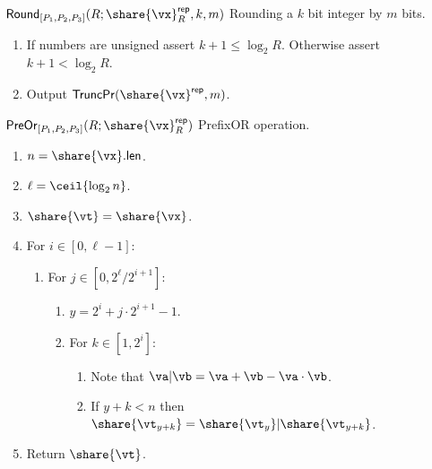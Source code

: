\msubsubsection
  {$\mathsf{Round}_{[P_1, P_2, P_3]}(R; \share{\vx}^\mathsf{rep}_R, k, m)$}
  Rounding a $k$ bit integer by $m$ bits.
  \begin{enumerate}
  \item If numbers are unsigned assert $k + 1 \leq \log_2{R}$. Otherwise assert $k+1 < \log_2{R}$.
  \item Output $\mathsf{TruncPr}(\share{\vx}^\mathsf{rep}, m)$.
\end{enumerate}

\msubsubsection
  {$\mathsf{PreOr}_{[P_1, P_2, P_3]}(R; \share{\vx}^\mathsf{rep}_R)$}
  PrefixOR operation.
  \begin{enumerate}
    \item $n = \share{\vx}.\mathsf{len}$.
    \item $\ell = \ceil{\log_2{n}}$.
    \item $\share{\vt} = \share{\vx}$.
    \item For $i \in [0, \ell-1]$:
    \begin{enumerate}
      \item For $j \in [0, 2^\ell/2^{i+1}]$:
      \begin{enumerate}
        \item $y = 2^i + j \cdot 2^{i+1} - 1$.
        \item For $k \in [1, 2^i]$:
        \begin{enumerate}
            \item Note that $\va | \vb = \va + \vb - \va \cdot \vb$.
            \item If $y + k < n$ then $\share{\vt_{y+k}} = \share{\vt_y} | \share{\vt_{y + k}}$.
        \end{enumerate}
      \end{enumerate}
    \end{enumerate}
    \item Return $\share{\vt}$.
\end{enumerate}

